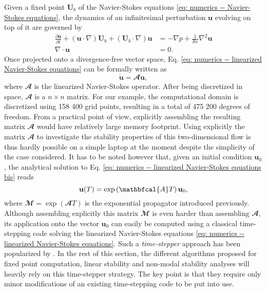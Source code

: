 Given a fixed point $\mathbf{U}_b$ of the Navier-Stokes equations \eqref{eq: numerics -- Navier-Stokes equations}, the dynamics of an infinitesimal perturbation $\mathbf{u}$ evolving on top of it are governed by
\begin{equation}
  \begin{aligned}
    \displaystyle \frac{\partial \mathbf{u}}{\partial t} + \left( \mathbf{u} \cdot \nabla \right) \mathbf{U}_b  + \left( \mathbf{U}_b \cdot \nabla \right) \mathbf{u} & = - \nabla p + \frac{1}{Re} \nabla^2 \mathbf{u} \\
    \nabla \cdot \mathbf{u} & = 0.
  \end{aligned}
  \label{eq: numerics -- linearized Navier-Stokes equations}
\end{equation}
Once projected onto a divergence-free vector space, Eq. \eqref{eq: numerics -- linearized Navier-Stokes equations} can be formally written as
\begin{equation}
  \dot{\mathbf{u}} = \mathbfcal{A}\mathbf{u},
  \label{eq: numerics -- linearized Navier-Stokes equations bis}
\end{equation}
where $\mathbfcal{A}$ is the linearized Navier-Stokes operator. After being discretized in space, $\mathbfcal{A}$ is a $n \times n$ matrix. For our example, the computational domain is discretized using 158 400 grid points, resulting in a total of 475 200 degrees of freedom. From a practical point of view, explicitly assembling the resulting matrix $\mathbfcal{A}$ would have relatively large memory footprint. Using explicitly the matrix $\mathbfcal{A}$ to investigate the stability properties of this two-dimensional flow is thus hardly possible on a simple laptop at the moment despite the simplicity of the case considered. It has to be noted however that, given an initial condition $\mathbf{u}_0$, the analytical solution to Eq. \eqref{eq: numerics -- linearized Navier-Stokes equations bis} reads
\begin{equation}
  \mathbf{u}(T) = \exp \left( \mathbfcal{A}T \right) \mathbf{u}_0,
  \notag
\end{equation}
where $\mathbfcal{M} = \exp \left( \mathbfcal{A}T \right)$ is the exponential propagator introduced previously. Although assembling explicitly this matrix $\mathbfcal{M}$ is even harder than assembling $\mathbfcal{A}$, its application onto the vector $\mathbf{u}_0$ can easily be computed using a classical time-stepping code solving the linearized Navier-Stokes equations \eqref{eq: numerics -- linearized Navier-Stokes equations}. Such a \emph{time-stepper} approach has been popularized by \cite{jcp:edwards:1994, aiaa:bagheri:2009}. In the rest of this section, the different algorithms proposed for fixed point computation, linear stability and non-modal stability analyses will heavily rely on this time-stepper strategy. The key point is that they require only minor modifications of an existing time-stepping code to be put into use.

